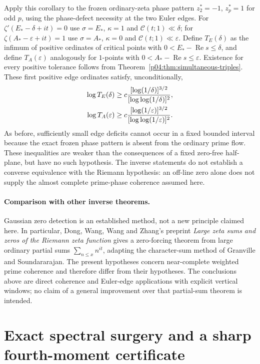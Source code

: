 \documentclass[11pt,letterpaper]{article}
\theoremstyle{definition}
\theoremstyle{remark}
\renewcommand{\Re}{\operatorname{Re}}
\newcommand{\1}{\mathbf 1}
\begin{document}
Apply this corollary to the frozen ordinary-zeta phase pattern
$z_2^*=-1$, $z_p^*=1$ for odd $p$, using the phase-defect
necessity at the two Euler edges.  For
$\zeta'(E_*-\delta+it)=0$ use
$\sigma=E_*$, $\kappa=1$ and
$\mathcal C(t;1)\ll\delta$; for
$\zeta(A_*-\varepsilon+it)=1$ use
$\sigma=A_*$, $\kappa=0$ and
$\mathcal C(t;1)\ll\varepsilon$.
Define $T_E(\delta)$ as the infimum of positive ordinates of
critical points with $0<E_*-\Re s\le\delta$, and define
$T_A(\varepsilon)$ analogously for $1$-points with
$0<A_*-\Re s\le\varepsilon$. Existence for every positive
tolerance follows from Theorem~\ref{p04:thm:simultaneous-triples}.
These first positive edge ordinates satisfy, unconditionally,
\begin{align}
 \log T_E(\delta)&\ge
 c\frac{[\log(1/\delta)]^{3/2}}
          {[\log\log(1/\delta)]^2},\notag\\
 \log T_A(\varepsilon)&\ge
 c\frac{[\log(1/\varepsilon)]^{3/2}}
          {[\log\log(1/\varepsilon)]^2}.
\label{p04:eq:zi-vk-edges}
\end{align}
As before, sufficiently small edge deficits cannot occur in a fixed
bounded interval because the exact frozen phase pattern is absent
from the ordinary prime flow.  These inequalities are weaker than
the consequences of a fixed zero-free half-plane, but have no such
hypothesis.  The inverse statements do not establish a converse
equivalence with the Riemann hypothesis: an off-line zero alone
does not supply the almost complete prime-phase coherence assumed
here.

\paragraph{Comparison with other inverse theorems.}
Gaussian zero detection is an established method, not a new principle
claimed here.  In particular, Dong, Wang, Wang and Zhang's preprint
\emph{Large zeta sums and zeros of the Riemann zeta function}
\cite{DongInverse} gives a zero-forcing theorem from large ordinary
partial sums $\sum_{n\le x}n^{it}$, adapting the character-sum method
of Granville and Soundararajan.  The present hypotheses concern
near-complete weighted prime coherence and therefore differ from
their hypotheses.  The conclusions above are direct coherence and
Euler-edge applications with explicit vertical windows; no claim
of a general improvement over that partial-sum theorem is intended.




\section{Exact spectral surgery and a sharp fourth-moment certificate}
\label{p03:sec:fourmoments}
\end{document}
